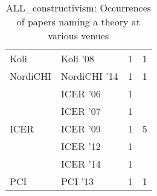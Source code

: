 \begin{table*}[t]
\begin{tabular}{llrr}
\multirow{1}{*}{Koli } & Koli '08 & 1 & \multirow{1}{*}{1}\\
\multirow{1}{*}{NordiCHI } & NordiCHI '14 & 1 & \multirow{1}{*}{1}\\
\multirow{5}{*}{ICER } & ICER '06 & 1 & \multirow{5}{*}{5}\\
& ICER '07 & 1 &\\
& ICER '09 & 1 &\\
& ICER '12 & 1 &\\
& ICER '14 & 1 &\\
\multirow{1}{*}{PCI } & PCI '13 & 1 & \multirow{1}{*}{1}\\
\end{tabular}
\caption{ALL\_constructivism: Occurrences of papers naming a theory at various venues}
\end{table*}
